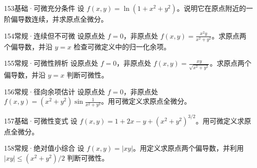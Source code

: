 \begin{exercise}{153}{基础·可微充分条件}
设 $f(x,y)=\ln(1+x^2+y^2)$。说明它在原点附近的一阶偏导数连续，并求原点全微分。
\end{exercise}
\begin{exercise}{154}{常规·连续但不可微}
设原点处 $f=0$，非原点处 $f(x,y)=\frac{x^2y}{x^2+y^2}$。求原点两个偏导数，并沿 $y=x$ 检查可微定义中的归一化余项。
\end{exercise}
\begin{exercise}{155}{常规·可微性辨析}
设原点处 $f=0$，非原点处 $f(x,y)=\frac{xy}{\sqrt{x^2+y^2}}$。求原点两个偏导数，并沿 $y=x$ 判断可微性。
\end{exercise}
\begin{exercise}{156}{常规·径向余项估计}
设原点处 $f=0$，非原点处 $f(x,y)=(x^2+y^2)\sin\frac1{x^2+y^2}$。用可微定义求原点全微分。
\end{exercise}
\begin{exercise}{157}{基础·可微性变式}
设 $f(x,y)=1+2x-y+(x^2+y^2)^{3/2}$。用可微定义求原点全微分。
\end{exercise}
\begin{exercise}{158}{常规·绝对值小综合}
设 $f(x,y)=|xy|$。用定义求原点两个偏导数，并利用 $|xy|\le(x^2+y^2)/2$ 判断可微性。
\end{exercise}
